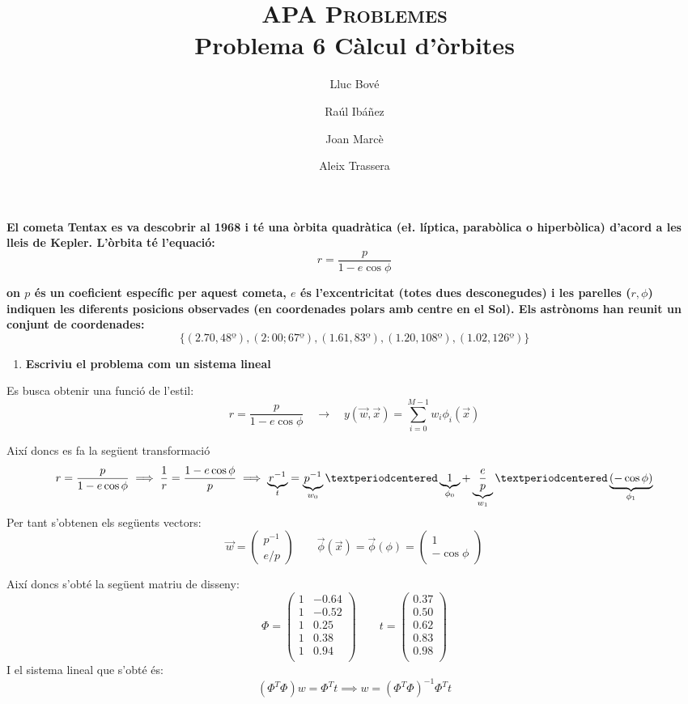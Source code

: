 \documentclass[a4paper]{article}
\title{\textsc{APA Problemes} \\ Problema 6 Càlcul d'òrbites}
\author{Lluc Bové \and Raúl Ibáñez \and Joan Marcè \and Aleix Trassera}
\date{}
\begin{document}
\maketitle

\textbf{El cometa Tentax es va descobrir al 1968 i té una òrbita quadràtica (e\l. líptica, parabòlica o hiperbòlica) d'acord a les lleis de Kepler. L'òrbita té l'equació:}
$$
r = \frac{p}{1 - e \cos \phi}
$$

\textbf{on $p$ és un coeficient específic per aquest cometa, $e$ és l'excentricitat (totes dues desconegudes) i les parelles ($r,\phi$) indiquen les diferents posicions observades (en coordenades polars amb centre en el Sol). Els astrònoms han reunit un conjunt de coordenades:}
$$
\{(2.70, 48º), (2:00; 67º), (1.61, 83º), (1.20, 108º), (1.02, 126º)\}
$$

\begin{enumerate}
	\item \textbf{Escriviu el problema com un sistema lineal}
\end{enumerate}

Es busca obtenir una funció de l'estil:
$$
r = \frac{p}{1 - e \cos\phi} \quad \longrightarrow \quad y(\vec{w}, \vec{x}) = \sum_{i=0}^{M - 1} w_i \phi_i(\vec{x})
$$

Així doncs es fa la següent transformació
$$
r = \frac{p}{1 - e \cos \phi} \implies \frac{1}{r} = \frac{1 - e \cos \phi}{p} 
\implies \underbrace{r^{-1}}_{t} = 
\underbrace{p^{-1}}_{w_0}·
\underbrace{1}_{\mathclap{\phi_0}} +
\underbrace{\frac{e}{p}}_{w_1}·\underbrace{(-\cos\phi)}_{\phi_1}
$$
Per tant s'obtenen els següents vectors:
$$
\vec{w} = 
\begin{pmatrix}
p^{-1}\\
e/p
\end{pmatrix}
\qquad
\vec{\phi}(\vec{x}) = \vec{\phi}(\phi) =
\begin{pmatrix}
1\\
- \cos \phi 
\end{pmatrix}
$$

Així doncs s'obté la següent matriu de disseny:
$$
\Phi = 
\begin{pmatrix}
1 & -0.64 \\
1 & -0.52 \\
1 & 0.25 \\
1 & 0.38 \\
1 & 0.94 \\
\end{pmatrix}
\qquad
t =
\begin{pmatrix}
0.37 \\
0.50 \\
0.62 \\
0.83 \\
0.98 \\
\end{pmatrix}
$$
I el sistema lineal que s'obté és:
$$
(\Phi^T\Phi)w = \Phi^T t \implies w = (\Phi^T\Phi)^{-1} \Phi^T t 
$$
\end{document}
